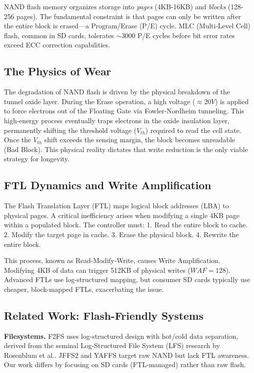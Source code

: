 \documentclass[conference]{IEEEtran}
\begin{document}
NAND flash memory organizes storage into \textit{pages} (4KB-16KB) and \textit{blocks} (128-256 pages). The fundamental constraint is that pages can only be written after the entire block is erased---a Program/Erase (P/E) cycle. MLC (Multi-Level Cell) flash, common in SD cards, tolerates $\sim$3000 P/E cycles before bit error rates exceed ECC correction capabilities. 

\subsection{The Physics of Wear}


The degradation of NAND flash is driven by the physical breakdown of the tunnel oxide layer.  During the Erase operation, a high voltage ($\approx 20V$) is applied to force electrons out of the Floating Gate via Fowler-Nordheim tunneling. This high-energy process eventually traps electrons in the oxide insulation layer, permanently shifting the threshold voltage ($V_{th}$) required to read the cell state. Once the $V_{th}$ shift exceeds the sensing margin, the block becomes unreadable (Bad Block). This physical reality dictates that write reduction is the only viable strategy for longevity.

\subsection{FTL Dynamics and Write Amplification}

The Flash Translation Layer (FTL) maps logical block addresses (LBA) to physical pages.  A critical inefficiency arises when modifying a single 4KB page within a populated block. The controller must:
1. Read the entire block to cache.
2. Modify the target page in cache.
3. Erase the physical block.
4. Rewrite the entire block.

This process, known as Read-Modify-Write, causes Write Amplification. Modifying 4KB of data can trigger 512KB of physical writes ($WAF = 128$). Advanced FTLs use log-structured mapping, but consumer SD cards typically use cheaper, block-mapped FTLs, exacerbating the issue.

\subsection{Related Work: Flash-Friendly Systems}

\textbf{Filesystems.} F2FS uses log-structured design with hot/cold data separation, derived from the seminal Log-Structured File System (LFS) research by Rosenblum et al.. JFFS2 and YAFFS target raw NAND but lack FTL awareness. Our work differs by focusing on SD cards (FTL-managed) rather than raw flash.
\end{document}
